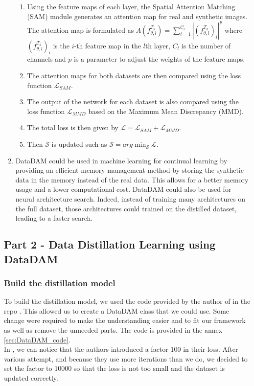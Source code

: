 \documentclass[onecolumn]{IEEEtran}
\begin{document}
\begin{enumerate}[label=(\alph*)]
\begin{enumerate}[label=(\arabic*)]
        \item Using the feature maps of each layer, the Spatial Attention Matching (SAM) module generates an attention map for real and synthetic images. The attention map is formulated as $A(f_{\theta,l}^{T_k}) = \sum_{i=1}^{C_l} | (f_{\theta,l}^{T_k})_i|^p$ where $(f_{\theta,l}^{T_k})_i$ is the $i$-th feature map in the $l$th layer, $C_l$ is the number of channels and $p$ is a parameter to adjust the weights of the feature maps.
        \item The attention maps for both datasets are then compared using the loss function $\mathcal{L}_{SAM}$.
        \item The output of the network for each dataset is also compared using the loss function $\mathcal{L}_{MMD}$ based on the Maximum Mean Discrepancy (MMD).
        \item The total loss is then given by $\mathcal{L} = \mathcal{L}_{SAM} + \mathcal{L}_{MMD}$.
        \item Then $\mathcal{S}$ is updated such as $\mathcal{S} = arg \min_{\mathcal{S}} \mathcal{L}$.
    \end{enumerate}
    \vspace{3mm}
    \item DataDAM could be used in machine learning for continual learning by providing an efficient memory management method by storing the synthetic data in the memory instead of the real data. This allows for a better memory usage and a lower computational cost. DataDAM could also be used for neural architecture search. Indeed, instead of training many architectures on the full dataset, those architectures could trained on the distilled dataset, leading to a faster search.
\end{enumerate}

\subsection{Part 2 - Data Distillation Learning using DataDAM}
\subsubsection{Build the distillation model}
To build the distillation model, we used the code provided by the author of \cite{sajedi2023datadam} in the repo \cite{githubGitHubDataDistillationDataDAM}. This allowed us to create a DataDAM class that we could use. Some change were required to make the understanding easier and to fit our framework as well as remove the unneeded parts. The code is provided in the annex \ref{sec:DataDAM_code}.
\\
In \cite{githubGitHubDataDistillationDataDAM}, we can notice that the authors introduced a factor $100$ in their loss. After various attempt, and because they use more iterations than we do, we decided to set the factor to $10 000$ so that the loss is not too small and the dataset is updated correctly.
\\
\end{document}
